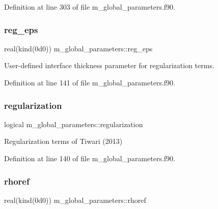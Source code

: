 Definition at line 303 of file m\+\_\+global\+\_\+parameters.\+f90.

\mbox{\label{namespacem__global__parameters_a4491f30721e61e94907cac95ff506795}} 
\subsubsection{\texorpdfstring{reg\+\_\+eps}{reg\_eps}}
{\footnotesize\ttfamily real(kind(0d0)) m\+\_\+global\+\_\+parameters\+::reg\+\_\+eps}



User-\/defined interface thickness parameter for regularization terms. 



Definition at line 141 of file m\+\_\+global\+\_\+parameters.\+f90.

\mbox{\label{namespacem__global__parameters_ac60a57ea5298dde379e24b6b77762101}} 
\subsubsection{\texorpdfstring{regularization}{regularization}}
{\footnotesize\ttfamily logical m\+\_\+global\+\_\+parameters\+::regularization}



Regularization terms of Tiwari (2013) 



Definition at line 140 of file m\+\_\+global\+\_\+parameters.\+f90.

\mbox{\label{namespacem__global__parameters_a485a360d73013d7bce1daa01df404534}} 
\subsubsection{\texorpdfstring{rhoref}{rhoref}}
{\footnotesize\ttfamily real(kind(0d0)) m\+\_\+global\+\_\+parameters\+::rhoref}



